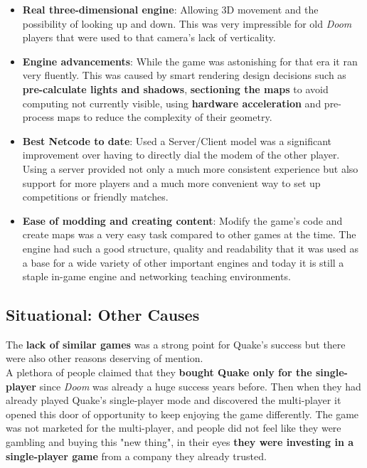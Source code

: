 \begin{itemize}
	\item \textbf{Real three-dimensional engine}: Allowing 3D movement and the possibility of looking up and down. This was very impressible for old \textit{Doom} players that were used to that camera's lack of verticality.
	\item \textbf{Engine advancements}: While the game was astonishing for that era it ran very fluently. This was caused by smart rendering design decisions such as \textbf{pre-calculate lights and shadows}, \textbf{sectioning the maps} to avoid computing not currently visible, using \textbf{hardware acceleration} and pre-process maps to reduce the complexity of their geometry.
	\item \textbf{Best Netcode to date}: Used a Server/Client model was a significant improvement over having to directly dial the modem of the other player. Using a server provided not only a much more consistent experience but also support for more players and a much more convenient way to set up competitions or friendly matches.
	\item \textbf{Ease of modding and creating content}: Modify the game's code and create maps was a very easy task compared to other games at the time. The engine had such a good structure, quality and readability that it was used as a base for a wide variety of other important engines and today it is still a staple in-game engine and networking teaching environments.
\end{itemize}

\subsection{Situational: Other Causes}

The \textbf{lack of similar games} was a strong point for Quake's success but there were also other reasons deserving of mention.\\

A plethora of people claimed that they \textbf{bought Quake only for the single-player} since \textit{Doom} was already a huge success years before. Then when they had already played Quake's single-player mode and discovered the multi-player it opened this door of opportunity to keep enjoying the game differently. The game was not marketed for the multi-player, and people did not feel like they were gambling and buying this "new thing", in their eyes \textbf{they were investing in a single-player game} from a company they already trusted.\\

